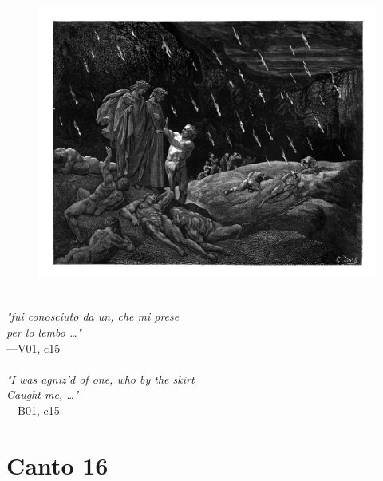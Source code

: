 \documentclass[../Dore_vision.tex]{subfiles}
\begin{document}
\begin{figure}[ht]
\centering
\includegraphics[height=\figsize]{illustrations/book_1/V01, c15.jpg}
\end{figure}

\begin{center}
\begin{minipage}{0.8\linewidth}
\textit{\\
"fui conosciuto da un, che mi prese\\per lo lembo …"} \\
—V01, c15 \\~\\
\textit{"I was agniz'd of one, who by the skirt\\Caught me, …"} \\
—B01, c15
\end{minipage}
\end{center}

\newpage

\section{Canto 16}
\end{document}
